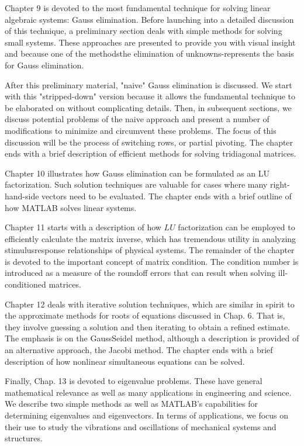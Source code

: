 \documentclass[../main.tex]{subfiles}
\begin{document}
Chapter 9 is devoted to the most fundamental technique for solving linear algebraic systems: Gauss elimination. Before launching into a detailed discussion of this technique, a preliminary section deals with simple methods for solving small systems. These approaches are presented to provide you with visual insight and because one of the methodsthe elimination of unknowns-represents the basis for Gauss elimination.

After this preliminary material, "naive" Gauss elimination is discussed. We start with this "stripped-down" version because it allows the fundamental technique to be elaborated on without complicating details. Then, in subsequent sections, we discuss potential problems of the naive approach and present a number of modifications to minimize and circumvent these problems. The focus of this discussion will be the process of switching rows, or partial pivoting. The chapter ends with a brief description of efficient methods for solving tridiagonal matrices.

Chapter 10 illustrates how Gauss elimination can be formulated as an LU factorization. Such solution techniques are valuable for cases where many right-hand-side vectors need to be evaluated. The chapter ends with a brief outline of how MATLAB solves linear systems.

Chapter 11 starts with a description of how $L U$ factorization can be employed to efficiently calculate the matrix inverse, which has tremendous utility in analyzing stimulusresponse relationships of physical systems. The remainder of the chapter is devoted to the important concept of matrix condition. The condition number is introduced as a measure of the roundoff errors that can result when solving ill-conditioned matrices.

Chapter 12 deals with iterative solution techniques, which are similar in spirit to the approximate methods for roots of equations discussed in Chap. 6. That is, they involve guessing a solution and then iterating to obtain a refined estimate. The emphasis is on the GaussSeidel method, although a description is provided of an alternative approach, the Jacobi method. The chapter ends with a brief description of how nonlinear simultaneous equations can be solved.

Finally, Chap. 13 is devoted to eigenvalue problems. These have general mathematical relevance as well as many applications in engineering and science. We describe two simple methods as well as MATLAB's capabilities for determining eigenvalues and eigenvectors. In terms of applications, we focus on their use to study the vibrations and oscillations of mechanical systems and structures.
\end{document}
